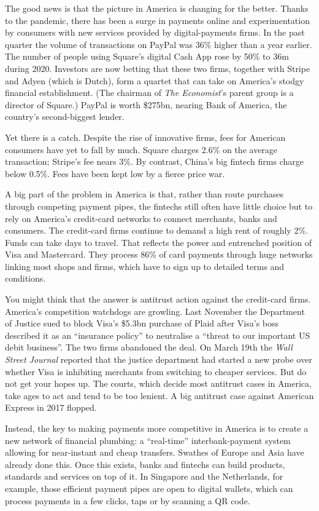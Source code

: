 \documentclass{article}
\begin{document}
The good news is that the picture in America is changing for the better. Thanks to the pandemic, there has been a surge in payments online and experimentation by consumers with new services provided by digital-payments firms. In the past quarter the volume of transactions on PayPal was 36\% higher than a year earlier. The number of people using Square's digital Cash App rose by 50\% to 36m during 2020. Investors are now betting that these two firms, together with Stripe and Adyen (which is Dutch), form a quartet that can take on America's stodgy financial establishment. (The chairman of \emph{The Economist}'s parent group is a director of Square.) PayPal is worth \$275bn, nearing Bank of America, the country's second-biggest lender. 

Yet there is a catch. Despite the rise of innovative firms, fees for American consumers have yet to fall by much. Square charges 2.6\% on the average transaction; Stripe's fee nears 3\%. By contrast, China's big fintech firms charge below 0.5\%. Fees have been kept low by a fierce price war. 

A big part of the problem in America is that, rather than route purchases through competing payment pipes, the fintechs still often have little choice but to rely on America's credit-card networks to connect merchants, banks and consumers. The credit-card firms continue to demand a high rent of roughly 2\%. Funds can take days to travel. That reflects the power and entrenched position of Visa and Mastercard. They process 86\% of card payments through huge networks linking most shops and firms, which have to sign up to detailed terms and conditions. 

You might think that the answer is antitrust action against the credit-card firms. America's competition watchdogs are growling. Last November the Department of Justice sued to block Visa's \$5.3bn purchase of Plaid after Visa's boss described it as an ``insurance policy'' to neutralise a ``threat to our important US debit business''. The two firms abandoned the deal. On March 19th the \emph{Wall Street Journal} reported that the justice department had started a new probe over whether Visa is inhibiting merchants from switching to cheaper services. But do not get your hopes up. The courts, which decide most antitrust cases in America, take ages to act and tend to be too lenient. A big antitrust case against American Express in 2017 flopped. 

Instead, the key to making payments more competitive in America is to create a new network of financial plumbing: a ``real-time'' interbank-payment system allowing for near-instant and cheap transfers. Swathes of Europe and Asia have already done this. Once this exists, banks and fintechs can build products, standards and services on top of it. In Singapore and the Netherlands, for example, those efficient payment pipes are open to digital wallets, which can process payments in a few clicks, taps or by scanning a QR code. 
\end{document}
